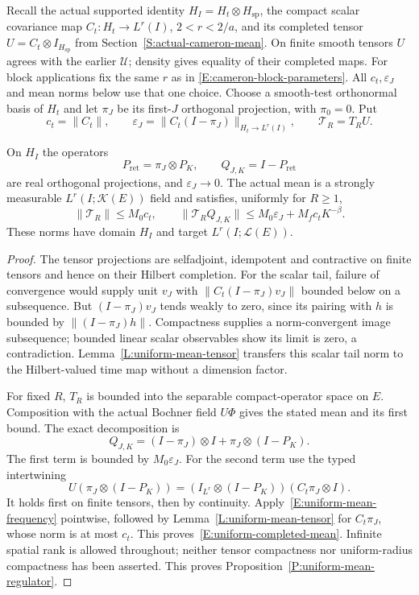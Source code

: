 Recall the actual supported identity $H_I=H_t\otimes H_{\mathrm{sp}}$,
the compact scalar covariance map $C_t:H_t\to L^r(I)$, $2<r<2/a$,
and its completed tensor $U=C_t\otimes I_{H_{\mathrm{sp}}}$ from
Section~\ref{S:actual-cameron-mean}.
On finite smooth tensors $U$ agrees with the earlier $\mathcal U$;
density gives equality of their completed maps.
For block applications fix the same $r$ as in
\eqref{E:cameron-block-parameters}. All $c_t,\varepsilon_J$ and
mean norms below use that one choice.
Choose a smooth-test orthonormal basis of $H_t$ and let $\pi_J$
be its first-$J$ orthogonal projection, with $\pi_0=0$.
Put
\[
  c_t=\|C_t\|,\qquad
  \varepsilon_J=\|C_t(I-\pi_J)\|_{H_t\to L^r(I)},\qquad
  \mathcal T_R=T_RU .
\]

\begin{proposition}
  \label{P:uniform-mean-regulator}
  On $H_I$ the operators
  \[
    P_{\mathrm{ret}}=\pi_J\otimes P_K,\qquad
    Q_{J,K}=I-P_{\mathrm{ret}}
  \]
  are real orthogonal projections, and $\varepsilon_J\to0$.
  The actual mean is a strongly measurable
  $L^r(I;\mathcal K(E))$ field and satisfies, uniformly for $R\ge1$,
  \begin{equation}\label{E:uniform-completed-mean}
    \|\mathcal T_R\|\le M_0c_t,\qquad
    \|\mathcal T_RQ_{J,K}\|
    \le M_0\varepsilon_J+M_fc_tK^{-\beta}.
  \end{equation}
  These norms have domain $H_I$ and target $L^r(I;\mathcal L(E))$.
\end{proposition}

\begin{proof}
  The tensor projections are selfadjoint, idempotent and contractive
  on finite tensors and hence on their Hilbert completion.
  For the scalar tail, failure of convergence would supply unit
  $v_J$ with $\|C_t(I-\pi_J)v_J\|$ bounded below on a subsequence.
  But $(I-\pi_J)v_J$ tends weakly to zero, since its pairing with
  $h$ is bounded by $\|(I-\pi_J)h\|$.
  Compactness supplies a norm-convergent image subsequence; bounded
  linear scalar observables show its limit is zero, a contradiction.
  Lemma~\ref{L:uniform-mean-tensor} transfers this scalar tail norm
  to the Hilbert-valued time map without a dimension factor.

  For fixed $R$, $T_R$ is bounded into the separable compact-operator
  space on $E$. Composition with the actual Bochner field $U\Phi$
  gives the stated mean and its first bound.
  The exact decomposition is
  \[
    Q_{J,K}=(I-\pi_J)\otimes I+\pi_J\otimes(I-P_K).
  \]
  The first term is bounded by $M_0\varepsilon_J$.
  For the second term use the typed intertwining
  \[
    U(\pi_J\otimes(I-P_K))
    =(I_{L^r}\otimes(I-P_K))(C_t\pi_J\otimes I).
  \]
  It holds first on finite tensors, then by continuity.
  Apply~\eqref{E:uniform-mean-frequency} pointwise, followed by
  Lemma~\ref{L:uniform-mean-tensor} for $C_t\pi_J$, whose norm
  is at most $c_t$. This proves~\eqref{E:uniform-completed-mean}.
  Infinite spatial rank is allowed throughout; neither tensor
  compactness nor uniform-radius compactness has been asserted.
  This proves Proposition~\ref{P:uniform-mean-regulator}.
\end{proof}

